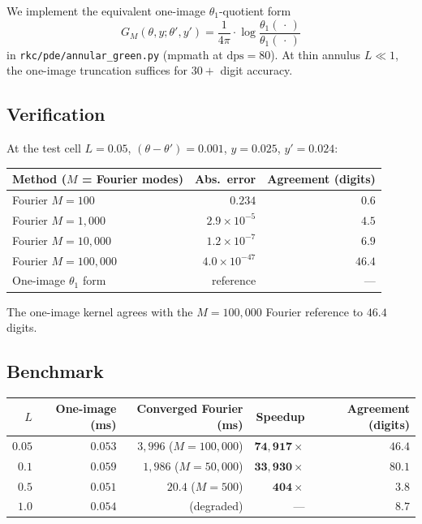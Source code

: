 \documentclass[11pt,reqno]{amsart}
\theoremstyle{definition}
\newcommand{\dps}{\mathrm{dps}}
\begin{document}
We implement the equivalent one-image $\theta_1$-quotient form
\begin{equation}\label{eq:annular-theta}
G_M(\theta, y; \theta', y') = \frac{1}{4\pi} \cdot \log
\frac{\theta_1(\,\cdot\,)}{\theta_1(\,\cdot\,)}
\end{equation}
in \verb|rkc/pde/annular_green.py| (mpmath at $\dps = 80$). At thin
annulus $L \ll 1$, the one-image truncation suffices for $30+$ digit
accuracy.

\subsection{Verification}
At the test cell $L = 0.05$, $(\theta - \theta') = 0.001$, $y = 0.025$,
$y' = 0.024$:
\begin{center}
\begin{tabular}{lrr}
\toprule
Method ($M$ = Fourier modes) & Abs.\ error & Agreement (digits) \\
\midrule
Fourier $M = 100$ & $0.234$ & $0.6$ \\
Fourier $M = 1{,}000$ & $2.9 \times 10^{-5}$ & $4.5$ \\
Fourier $M = 10{,}000$ & $1.2 \times 10^{-7}$ & $6.9$ \\
Fourier $M = 100{,}000$ & $4.0 \times 10^{-47}$ & $\mathbf{46.4}$ \\
One-image $\theta_1$ form & reference & --- \\
\bottomrule
\end{tabular}
\end{center}
The one-image kernel agrees with the $M = 100{,}000$ Fourier reference
to $46.4$ digits.

\subsection{Benchmark}
\begin{center}
\begin{tabular}{rrrrr}
\toprule
$L$ & One-image (ms) & Converged Fourier (ms) & Speedup & Agreement (digits) \\
\midrule
$0.05$ & $0.053$ & $3{,}996$ ($M = 100{,}000$) & $\mathbf{74{,}917\times}$ & $46.4$ \\
$0.1$  & $0.059$ & $1{,}986$ ($M = 50{,}000$)  & $\mathbf{33{,}930\times}$ & $80.1$ \\
$0.5$  & $0.051$ & $20.4$  ($M = 500$)         & $\mathbf{404\times}$      & $3.8$ \\
$1.0$  & $0.054$ & (degraded)                  & ---                       & $8.7$ \\
\bottomrule
\end{tabular}
\end{center}
\end{document}
